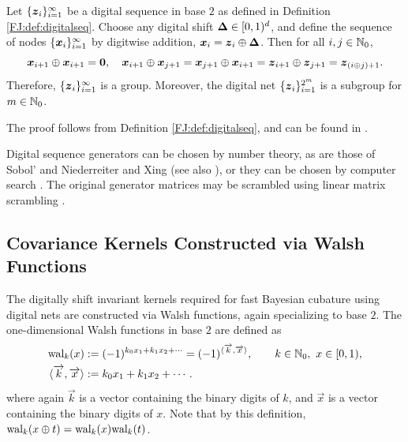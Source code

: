 \documentclass[graybox,footinfo]{svmult}
\begin{document}
\begin{lemma}
	\label{FJ:lemma:digital_net_prop}
	Let $\{{\boldsymbol{z}}_i\}_{i=1}^{\infty}$ be a digital sequence in base $2$ as defined in Definition \ref{FJ:def:digitalseq}.  Choose any digital shift ${\boldsymbol{\Delta}} \in [0,1)^d$, and define the sequence of nodes $\{{\boldsymbol{x}}_i\}_{i=1}^{\infty}$ by digitwise addition, ${\boldsymbol{x}}_{i} = {\boldsymbol{z}}_{i} \oplus {\boldsymbol{\Delta}}$.
	Then for all $i,j \in {\mathbb{N}}_0$,
	\begin{equation*}
	{\boldsymbol{x}}_{i+1} \oplus {\boldsymbol{x}}_{i+1} = \boldsymbol{0}, \quad 
	{\boldsymbol{x}}_{i+1} \oplus {\boldsymbol{x}}_{j+1} = {\boldsymbol{x}}_{j+1} \oplus {\boldsymbol{x}}_{i+1} = {\boldsymbol{z}}_{i+1} \oplus {\boldsymbol{z}}_{j+1} = {\boldsymbol{z}}_{(i \oplus j) + 1 }.
	\end{equation*}
	Therefore, $\{{\boldsymbol{z}}_i\}_{i=1}^{\infty}$ is a group.  Moreover, the digital net $\{{\boldsymbol{z}}_i\}_{i=1}^{2^m}$ is a subgroup for $m \in {{\mathbb{N}}}_0$.
\end{lemma}
The proof follows from Definition \ref{FJ:def:digitalseq}, and can be found in \cite{JagThesis19a}.

Digital sequence generators can be chosen by number theory, as are those of Sobol' \cite{Sob67} and Niederreiter and Xing  \cite{NieXin01a} (see also \cite[Chapter 8]{DicPil10a}), or they can be chosen by computer search \cite[Chapter 10]{DicPil10a}.  The original generator matrices may be scrambled using linear matrix scrambling \cite{Mat98}.


\subsection{Covariance Kernels Constructed via Walsh Functions} \label{FJ:sec:Walsh_kernels}

The digitally shift invariant kernels required for fast Bayesian cubature using digital nets are constructed via Walsh functions, again specializing to base $2$. 
The one-dimensional Walsh functions in base $2$ are defined as
\begin{align}
    \nonumber
\textup{wal}_{k}(x) & := (-1)^{k_0 x_1 + k_1 x_2 + \cdots} = (-1)^{\langle \overrightarrow{k}, \overrightarrow{x} \rangle},  \qquad k \in {{\mathbb{N}}}_0, \ x \in [0,1), \\
\nonumber
\langle \overrightarrow{k}, \overrightarrow{x} \rangle & : = k_{0} x_{1} + k_{1} x_{2} + \cdots .
\end{align}
where again $\overrightarrow{k}$ is a vector containing the binary digits of $k$, and $\overrightarrow{x}$ is a vector containing the binary digits of $x$.  Note that by this definition, $\textup{wal}_{k}(x \oplus t) =  \textup{wal}_{k}(x) \textup{wal}_{k}(t)$.  
\end{document}
